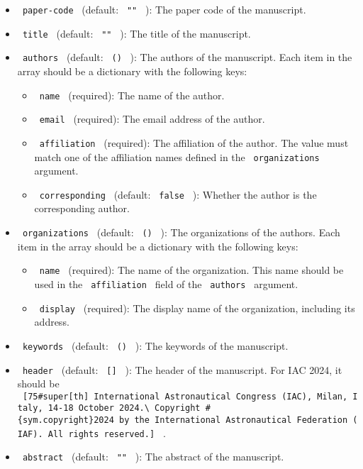 \begin{itemize}
\tightlist
\item
  \texttt{\ paper-code\ } (default: \texttt{\ ""\ } ): The paper code of
  the manuscript.
\item
  \texttt{\ title\ } (default: \texttt{\ ""\ } ): The title of the
  manuscript.
\item
  \texttt{\ authors\ } (default: \texttt{\ ()\ } ): The authors of the
  manuscript. Each item in the array should be a dictionary with the
  following keys:

  \begin{itemize}
  \tightlist
  \item
    \texttt{\ name\ } (required): The name of the author.
  \item
    \texttt{\ email\ } (required): The email address of the author.
  \item
    \texttt{\ affiliation\ } (required): The affiliation of the author.
    The value must match one of the affiliation names defined in the
    \texttt{\ organizations\ } argument.
  \item
    \texttt{\ corresponding\ } (default: \texttt{\ false\ } ): Whether
    the author is the corresponding author.
  \end{itemize}
\item
  \texttt{\ organizations\ } (default: \texttt{\ ()\ } ): The
  organizations of the authors. Each item in the array should be a
  dictionary with the following keys:

  \begin{itemize}
  \tightlist
  \item
    \texttt{\ name\ } (required): The name of the organization. This
    name should be used in the \texttt{\ affiliation\ } field of the
    \texttt{\ authors\ } argument.
  \item
    \texttt{\ display\ } (required): The display name of the
    organization, including its address.
  \end{itemize}
\item
  \texttt{\ keywords\ } (default: \texttt{\ ()\ } ): The keywords of the
  manuscript.
\item
  \texttt{\ header\ } (default: \texttt{\ {[}{]}\ } ): The header of the
  manuscript. For IAC 2024, it should be
  \texttt{\ {[}75\#super{[}th{]}\ International\ Astronautical\ Congress\ (IAC),\ Milan,\ Italy,\ 14-18\ October\ 2024.\textbackslash{}\ Copyright\ \#\{sym.copyright\}2024\ by\ the\ International\ Astronautical\ Federation\ (IAF).\ All\ rights\ reserved.{]}\ }
  .
\item
  \texttt{\ abstract\ } (default: \texttt{\ ""\ } ): The abstract of the
  manuscript.
\end{itemize}


